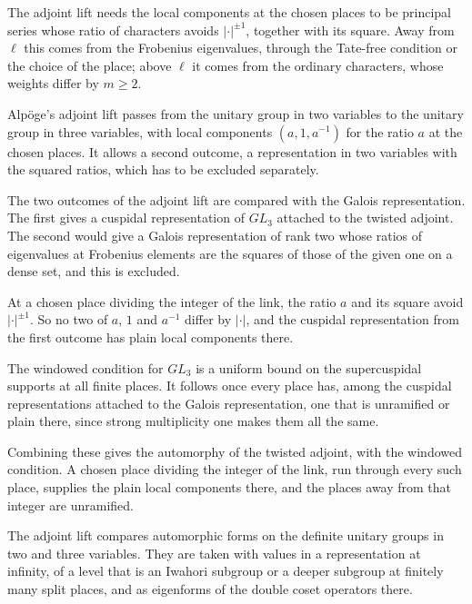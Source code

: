 The adjoint lift needs the local components at the chosen places to be principal series whose ratio of characters avoids $|\cdot|^{\pm1}$, together with its square. Away from $\ell$ this comes from the Frobenius eigenvalues, through the Tate-free condition or the choice of the place; above $\ell$ it comes from the ordinary characters, whose weights differ by $m\ge2$.

Alpöge's adjoint lift passes from the unitary group in two variables to the unitary group in three variables, with local components $(a,1,a^{-1})$ for the ratio $a$ at the chosen places. It allows a second outcome, a representation in two variables with the squared ratios, which has to be excluded separately.

The two outcomes of the adjoint lift are compared with the Galois representation. The first gives a cuspidal representation of $GL_3$ attached to the twisted adjoint. The second would give a Galois representation of rank two whose ratios of eigenvalues at Frobenius elements are the squares of those of the given one on a dense set, and this is excluded.

At a chosen place dividing the integer of the link, the ratio $a$ and its square avoid $|\cdot|^{\pm1}$. So no two of $a$, $1$ and $a^{-1}$ differ by $|\cdot|$, and the cuspidal representation from the first outcome has plain local components there.

The windowed condition for $GL_3$ is a uniform bound on the supercuspidal supports at all finite places. It follows once every place has, among the cuspidal representations attached to the Galois representation, one that is unramified or plain there, since strong multiplicity one makes them all the same.

Combining these gives the automorphy of the twisted adjoint, with the windowed condition. A chosen place dividing the integer of the link, run through every such place, supplies the plain local components there, and the places away from that integer are unramified.

The adjoint lift compares automorphic forms on the definite unitary groups in two and three variables. They are taken with values in a representation at infinity, of a level that is an Iwahori subgroup or a deeper subgroup at finitely many split places, and as eigenforms of the double coset operators there.

